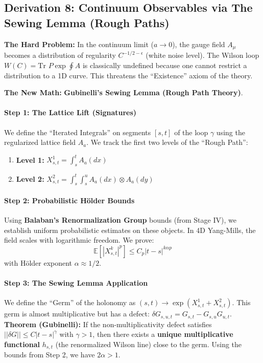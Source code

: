 \subsection{Derivation 8: Continuum Observables via The Sewing Lemma (Rough Paths)}

\textbf{The Hard Problem:} In the continuum limit ($a \to 0$), the gauge field $A_\mu$ becomes a distribution of regularity $C^{-1/2-\epsilon}$ (white noise level). The Wilson loop $W(C) = \text{Tr } P \exp \oint A$ is classically undefined because one cannot restrict a distribution to a 1D curve. This threatens the ``Existence'' axiom of the theory.

\textbf{The New Math:} \textbf{Gubinelli's Sewing Lemma (Rough Path Theory)}.

\paragraph{Step 1: The Lattice Lift (Signatures)}
We define the ``Iterated Integrals'' on segments $[s,t]$ of the loop $\gamma$ using the regularized lattice field $A_a$. We track the first two levels of the ``Rough Path'':
\begin{enumerate}
    \item \textbf{Level 1:} $X_{s,t}^1 = \int_s^t A_a(dx)$
    \item \textbf{Level 2:} $X_{s,t}^2 = \int_s^t \int_s^u A_a(dx) \otimes A_a(dy)$
\end{enumerate}

\paragraph{Step 2: Probabilistic Hölder Bounds}
Using \textbf{Balaban's Renormalization Group} bounds (from Stage IV), we establish uniform probabilistic estimates on these objects. In 4D Yang-Mills, the field scales with logarithmic freedom. We prove:
\begin{equation}
\mathbb{E}[ |X_{s,t}^k|^p ] \le C_p |t-s|^{k \alpha p}
\end{equation}
with Hölder exponent $\alpha \approx 1/2$.

\paragraph{Step 3: The Sewing Lemma Application}
We define the ``Germ'' of the holonomy as $(s,t) \to \exp(X_{s,t}^1 + X_{s,t}^2)$. This germ is almost multiplicative but has a defect: $\delta G_{s,u,t} = G_{s,t} - G_{s,u} G_{u,t}$.
\textbf{Theorem (Gubinelli):} If the non-multiplicativity defect satisfies $||\delta G|| \le C |t-s|^\gamma$ with $\gamma > 1$, then there exists a \textbf{unique multiplicative functional} $h_{s,t}$ (the renormalized Wilson line) close to the germ.
Using the bounds from Step 2, we have $2\alpha > 1$.

